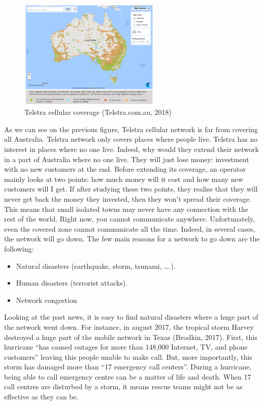 \begin{figure}[H]
	\centering
	\includegraphics[width=0.6\textwidth]{image/Teslra-coverage.png}
	\caption{Telstra cellular coverage (Telstra.com.au, 2018)}
	\label{fig:Telstra}
\end{figure}

As we can see on the previous figure, Telstra cellular network is far from covering all Australia. Telstra network only covers places where people live. Telstra has no interest in places where no one live. Indeed, why would they extend their network in a part of Australia where no one live. They will just lose money: investment with no new customers at the end. 
Before extending its coverage, an operator mainly looks at two points: how much money will it cost and how many new customers will I get. If after studying these two points, they realise that they will never get back the money they invested, then they won’t spread their coverage. This means that small isolated towns may never have any connection with the rest of the world.
Right now, you cannot communicate anywhere. Unfortunately, even the covered zone cannot communicate all the time.
Indeed, in several cases, the network will go down. The few main reasons for a network to go down are the following:
\begin{itemize}
	\item Natural disasters (earthquake, storm, tsunami, ….).
	\item Human disasters (terrorist attacks).
	\item Network congestion
\end{itemize}
	
Looking at the past news, it is easy to find natural disasters where a huge part of the network went down. For instance, in august 2017, the tropical storm Harvey destroyed a huge part of the mobile network in Texas (Brodkin, 2017). First, this hurricane “has caused outages for more than 148,000 Internet, TV, and phone customers” leaving this people unable to make call. But, more importantly, this storm has damaged more than “17 emergency call centers”. During a hurricane, being able to call emergency centre can be a matter of life and death. When 17 call centres are disturbed by a storm, it means rescue teams might not be as effective as they can be. 

